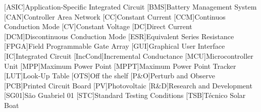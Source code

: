 



\begin{acronym}[H.264/mppt]

    [ASIC]{Application-Specific Integrated Circuit}
    [BMS]{Battery Management System}
    [CAN]{Controller Area Network}
    [CC]{Constant Current}
    [CCM]{Continuos Conduction Mode}
    [CV]{Constant Voltage}
    [DC]{Direct Current}
    [DCM]{Discontinuous Conduction Mode}
    [ESR]{Equivalent Series Resistance}
    [FPGA]{Field Programmable Gate Array}
    [GUI]{Graphical User Interface}
    [IC]{Integrated Circuit}
    [IncCond]{Incremental Conductance}
    [MCU]{Microcontroller Unit}
    [MPP]{Maximum Power Point}
    [MPPT]{Maximum Power Point Tracker}
    [LUT]{Look-Up Table}
    [OTS]{Off the shelf}
    [P\&O]{Perturb and Observe}
    [PCB]{Printed Circuit Board}
    [PV]{Photovoltaic}
    [R\&D]{Research and Development}
    [SG01]{São Guabriel 01}
    [STC]{Standard Testing Conditions}
    [TSB]{Técnico Solar Boat}


    

    

\end{acronym}






